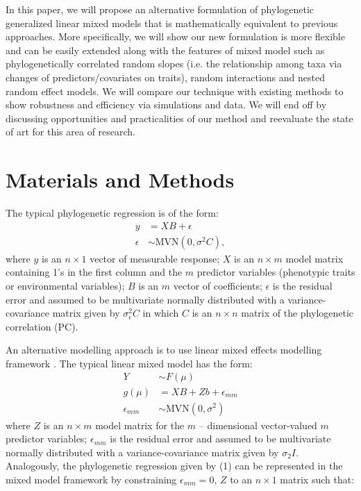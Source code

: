 In this paper, we will propose an alternative formulation of phylogenetic generalized linear mixed models that is mathematically equivalent to previous approaches. 
More specifically, we will show our new formulation is more flexible and can be easily extended along with the features of mixed model such as phylogenetically correlated random slopes (i.e. the relationship among taxa via changes of predictors/covariates on traits), random interactions  and nested random effect models.
We will compare our technique with existing methods to show robustness and efficiency via simulations and data.
We will end off by discussing opportunities and practicalities of our method and reevaluate the state of art for this area of research. 

\section{Materials and Methods}

The typical phylogenetic regression is of the form:
\begin{align}
y & = XB + \epsilon \\
\epsilon & \sim \textrm{MVN}(0,\sigma^{2}C),
\label{eq:gls}
\end{align}
where $y$ is an $n \times 1$ vector of measurable response; $X$ is an $n \times m$ model matrix containing 1's in the first column and the $m$ predictor variables (phenotypic traits or environmental variables); $B$ is an $m$ vector of coefficients; $\epsilon$ is the residual error and assumed to be multivariate normally distributed with a variance-covariance matrix given by $\sigma^{2}_{\epsilon}C$ in which $C$ is an $n \times n$ matrix of the phylogenetic correlation (PC).

An alternative modelling approach is to use linear mixed effects modelling framework \citep{lynch1991methods}.
The typical linear mixed model has the form:
\begin{align}
Y & \sim F(\mu) \\
g(\mu) & = XB + Zb + \epsilon_{mm} \\
\epsilon_{mm} & \sim \textrm{MVN}(0,\sigma^2)
\end{align}
where $Z$ is an $n \times m$ model matrix for the $m$ -- dimensional vector-valued $m$ predictor variables; $\epsilon_{mm}$ is the residual error and assumed to be multivariate normally distributed with a variance-covariance matrix given by $\sigma_{2}I$.
Analogously, the phylogenetic regression given by (1) can be represented in the mixed model framework by constraining $\epsilon_{mm} = 0$, $Z$ to an $n \times 1$ matrix such that: 

